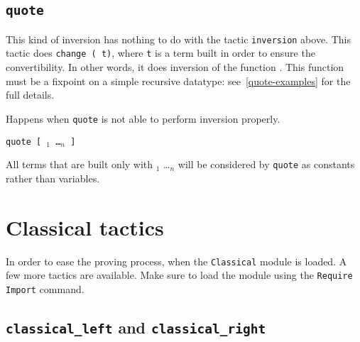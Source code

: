 \begin{coq_example*}



\subsection{\tt quote \ident}

This kind of inversion has nothing to do with the tactic
\texttt{inversion} above. This tactic does \texttt{change (\ident\
  t)}, where \texttt{t} is a term built in order to ensure the
convertibility. In other words, it does inversion of the function
\ident. This function must be a fixpoint on a simple recursive
datatype: see~\ref{quote-examples} for the full details.

\begin{ErrMsgs}
\item {}

  Happens when \texttt{quote} is not able to perform inversion properly.
\end{ErrMsgs}

\begin{Variants}
\item \texttt{quote {\ident} [ \ident$_1$ \dots \ident$_n$ ]}

  All terms that are built only with \ident$_1$ \dots \ident$_n$ will be
  considered by \texttt{quote} as constants rather than variables.
\end{Variants}


\section{Classical tactics}
\label{ClassicalTactics}

In order to ease the proving process, when the {\tt Classical} module is loaded. A few more tactics are available. Make sure to load the module using the \texttt{Require Import} command.

\subsection{{\tt classical\_left} and \tt classical\_right}
\tacindex{classical\_right}


\end{coq_example*}
